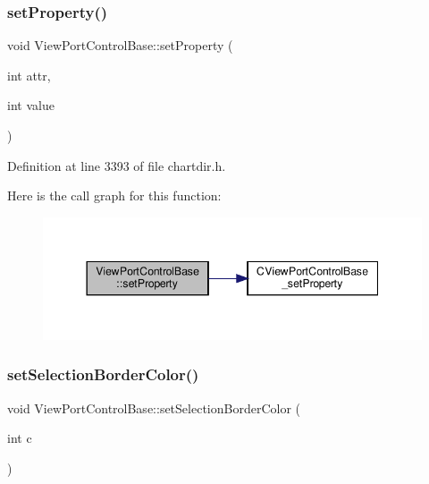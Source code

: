 \subsubsection{\texorpdfstring{set\+Property()}{setProperty()}}
{\footnotesize\ttfamily void View\+Port\+Control\+Base\+::set\+Property (\begin{DoxyParamCaption}\item[{int}]{attr,  }\item[{int}]{value }\end{DoxyParamCaption})\hspace{0.3cm}{\ttfamily [inline]}}



Definition at line 3393 of file chartdir.\+h.

Here is the call graph for this function\+:
\nopagebreak
\begin{figure}[H]
\begin{center}
\leavevmode
\includegraphics[width=344pt]{class_view_port_control_base_ad986d665159e9e2000958ef356a253b4_cgraph}
\end{center}
\end{figure}
\mbox{\label{class_view_port_control_base_a159e58f8274c0b2551819e3815f0f449}} 
\subsubsection{\texorpdfstring{set\+Selection\+Border\+Color()}{setSelectionBorderColor()}}
{\footnotesize\ttfamily void View\+Port\+Control\+Base\+::set\+Selection\+Border\+Color (\begin{DoxyParamCaption}\item[{int}]{c }\end{DoxyParamCaption})\hspace{0.3cm}{\ttfamily [inline]}}



